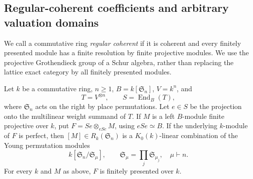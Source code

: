 \subsection{Regular-coherent coefficients and arbitrary valuation domains}
\label{C:regular-coherent-subsection}

We call a commutative ring \emph{regular coherent} if it is coherent
and every finitely presented module has a finite resolution by finite
projective modules.  We use the projective Grothendieck group of a
Schur algebra, rather than replacing the lattice exact category by
all finitely presented modules.

\begin{lemma}
\label{C:Schur-perfect-generation}
Let $k$ be a commutative ring, $n\geq1$, $B=k[\mathfrak S_n]$,
$V=k^n$, and
\[
 T=V^{\otimes n},\qquad S=\operatorname{End}_{B}(T),
\]
where $\mathfrak S_n$ acts on the right by place permutations.
Let $e\in S$ be the projection onto the multilinear weight summand
of $T$.  If $M$ is a left $B$-module finite projective over $k$,
put $F=Se\otimes_{eSe}M$, using $eSe\simeq B$.
If the underlying $k$-module of $F$ is perfect, then
$[M]\in R_k(\mathfrak S_n)$ is a $K_0(k)$-linear combination of the
Young permutation modules
\[
 k[\mathfrak S_n/\mathfrak S_\mu],\qquad
 \mathfrak S_\mu=\prod_j\mathfrak S_{\mu_j},\quad \mu\vdash n.
                                                               \tag{C.1.RC1}
\]
For every $k$ and $M$ as above, $F$ is finitely presented over $k$.
\end{lemma}

